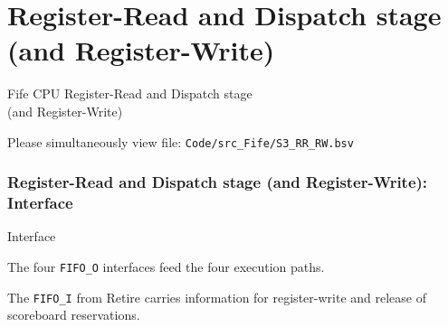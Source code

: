 
\section{Register-Read and Dispatch stage (and Register-Write)}

\begin{frame}[fragile]

\begin{center}
  {\LARGE Fife CPU Register-Read and Dispatch stage \\
          (and Register-Write)}

  \vspace{10ex}

  Please simultaneously view file: \hm \verb|Code/src_Fife/S3_RR_RW.bsv|
\end{center}

\end{frame}


\begin{frame}[fragile]
\frametitle{Register-Read and Dispatch stage (and Register-Write): Interface}

\footnotesize

\begin{minipage}{0.725\textwidth}
\end{minipage}
\hfill
\begin{minipage}{0.25\textwidth}
Interface

\vspace{2ex}

The four \verb|FIFO_O| interfaces feed the four execution paths.

\vspace{2ex}

The \verb|FIFO_I| from Retire carries information for register-write
and release of scoreboard reservations.
\end{minipage}

\end{frame}


